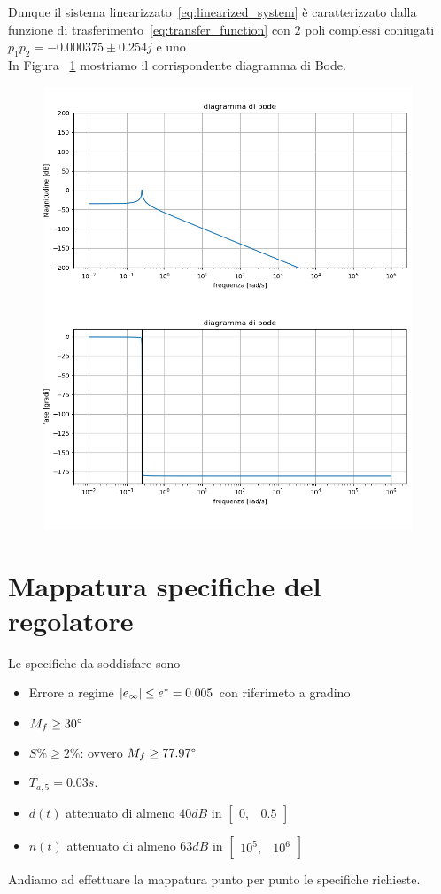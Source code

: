 \documentclass[a4paper, 11pt]{article}
\begin{document}
Dunque il sistema linearizzato~\eqref{eq:linearized_system} è caratterizzato dalla funzione di trasferimento~\eqref{eq:transfer_function} con $2$ poli complessi coniugati $p_1p_2 = -0.000375 \pm 0.254j $ e uno\\ In Figura ~\ref{Figura1} mostriamo il corrispondente diagramma di Bode. 
\begin{figure}[H]
    \centering
\includegraphics[width=110mm]{figs/bode_G.png}
    \caption{}
    \label{Figura1}
\end{figure}

\section{Mappatura specifiche del regolatore}
\label{sec:specifications}

Le specifiche da soddisfare sono
\begin{itemize}
	\item[1)] Errore a regime $\space |e_{\infty}| \le e^* = 0.005 $ con riferimeto a gradino
	\\
	\item[2)] $M_f \ge 30\degree$ 
 \\
	\item[3)] $S\%\ge 2\%$: ovvero $M_f \ge 77.97\degree$
 \\
	\item[4)] $T_{a,5} = 0.03s$. 
 \\
	\item[5)]$d(t)$ attenuato di almeno $40dB$ in $\begin{bmatrix}
	    0 , & 0.5
	\end{bmatrix}$
 \\
	\item[6)]$n(t)$ attenuato di almeno $63dB$ in $\begin{bmatrix}
	    10^5 , & 10^6
	\end{bmatrix}$
\end{itemize}
%
Andiamo ad effettuare la mappatura punto per punto le specifiche richieste.
\end{document}
